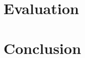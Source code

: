 \documentclass[11pt,twoside,final]{mitthesis}
\begin{document}
\chapter{Evaluation}%
\label{ch:eval}


\chapter{Conclusion}%
\label{ch:conclusion}



\begin{spacing}{1}
{}

\end{spacing}
\end{document}
